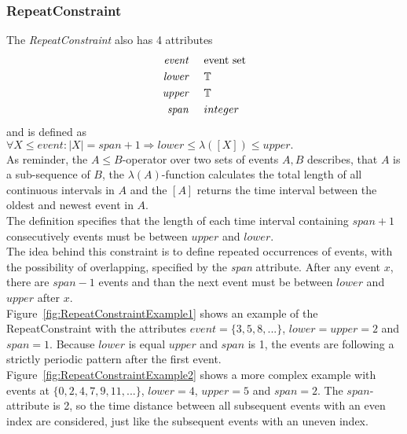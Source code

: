 	\subsubsection{RepeatConstraint}
		The \emph{RepeatConstraint} also has 4 attributes
		\begin{align*}
			\emph{event} & \hspace{.5cm}\text{event set}\\
			\emph{lower} & \hspace{.5cm}\text{$\mathbb{T}$}\\
			\emph{upper} & \hspace{.5cm}\text{$\mathbb{T}$}\\
			\emph{span}	 & \hspace{.5cm}\text{$integer$}\\
		\end{align*}
		and is defined as\\[10pt]
		\begin{math}
			\forall X\leq event: |X|=span+1\Rightarrow lower \leq \lambda([X])\leq upper.
		\end{math}\\[10pt]
		As reminder, the $A\leq B$-operator over two sets of events $A, B$ describes, that $A$ is a sub-sequence of $B$, the $\lambda(A)$-function calculates the total length of all continuous intervals in $A$ and the $[A]$ returns the time interval between the oldest and newest event in $A$.\\
		The definition specifies that the length of each time interval containing $span+1$ consecutively events must be between $upper$ and $lower$.\\
		The idea behind this constraint is to define repeated occurrences of events, with the possibility of overlapping, specified by the \emph{span} attribute. After any event $x$, there are $span-1$ events and than the next event must be between $lower$ and $upper$ after $x$.\\
		Figure~\ref{fig:RepeatConstraintExample1} shows an example of the RepeatConstraint with the attributes $event=\{3,5,8,...\}$, $lower=upper=2$ and $span=1$. Because $lower$ is equal $upper$ and $span$ is 1, the events are following a strictly periodic pattern after the first event. Figure~\ref{fig:RepeatConstraintExample2} shows a more complex example with events at $\{0, 2, 4, 7, 9, 11,...\}$, $lower=4$, $upper=5$ and $span=2$. The $span$-attribute is 2, so the time distance between all subsequent events with an even index are considered, just like the subsequent events with an uneven index. 
		
